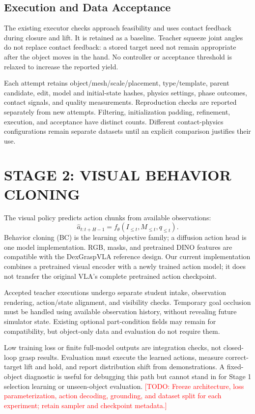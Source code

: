 \documentclass[letterpaper, 10 pt, conference]{ieeeconf}
\newcommand{\todo}[1]{\textcolor{red}{[TODO: #1]}}
\begin{document}
\subsection{Execution and Data Acceptance}
The existing executor checks approach feasibility and uses contact feedback
during closure and lift. It is retained as a baseline. Teacher squeeze joint
angles do not replace contact feedback: a stored target need not remain
appropriate after the object moves in the hand. No controller or acceptance
threshold is relaxed to increase the reported yield.

Each attempt retains object/mesh/scale/placement, type/template, parent candidate,
edit, model and initial-state hashes, physics settings, phase outcomes, contact
signals, and quality measurements. Reproduction checks are reported separately
from new attempts. Filtering, initialization padding, refinement, execution,
and acceptance have distinct counts. Different contact-physics configurations
remain separate datasets until an explicit comparison justifies their use.

\section{STAGE 2: VISUAL BEHAVIOR CLONING}
The visual policy predicts action chunks from available observations:
\begin{equation}
\hat a_{t:t+H-1}=f_\theta(I_{\leq t},M_{\leq t},q_{\leq t}).
\end{equation}
Behavior cloning (BC) is the learning objective family; a diffusion action head
is one model implementation. RGB, masks, and pretrained DINO features are
compatible with the DexGraspVLA reference design. Our current implementation
combines a pretrained visual encoder with a newly trained action model; it does
not transfer the original VLA's complete pretrained action checkpoint.

Accepted teacher executions undergo separate student intake, observation
rendering, action/state alignment, and visibility checks. Temporary goal
occlusion must be handled using available observation history, without revealing
future simulator state. Existing optional part-condition fields may remain for
compatibility, but object-only data and evaluation do not require them.

Low training loss or finite full-model outputs are integration checks, not
closed-loop grasp results. Evaluation must execute the learned actions, measure
correct-target lift and hold, and report distribution shift from demonstrations.
A fixed-object diagnostic is useful for debugging this path but cannot stand in
for Stage 1 selection learning or unseen-object evaluation.
\todo{Freeze architecture, loss parameterization, action decoding, grounding,
and dataset split for each experiment; retain sampler and checkpoint metadata.}
\end{document}

